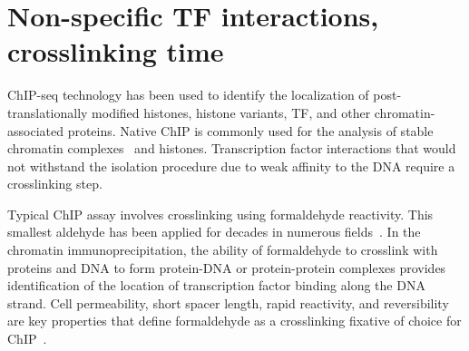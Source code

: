 
\section{Non-specific TF interactions, crosslinking time}

ChIP-seq technology has been used to identify the localization of post-translationally modified histones, histone variants, TF, and other chromatin-associated proteins.
Native ChIP is commonly used for the analysis of stable chromatin complexes~\cite{kasinathan2014high} and histones.
Transcription factor interactions that would not withstand the isolation procedure due to weak affinity to the DNA require a crosslinking step.


Typical ChIP assay involves crosslinking using formaldehyde reactivity. 
This smallest aldehyde has been applied for decades in numerous fields~\cite{eckels2003formalin,werner2000effect,gavrilov2015vivo}.
In the chromatin immunoprecipitation, the ability of formaldehyde to crosslink with proteins and DNA to form protein-DNA or protein-protein complexes provides identification of the location of transcription factor binding along the DNA strand.
Cell permeability, short spacer length, rapid reactivity, and reversibility are key properties that define formaldehyde as a crosslinking fixative of choice for ChIP~\cite{hoffman2015formaldehyde}.

